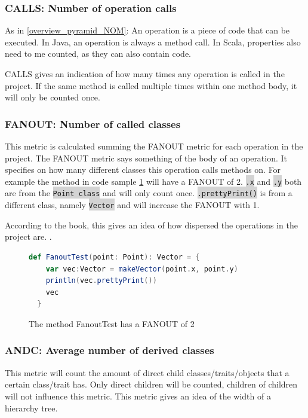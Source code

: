 \documentclass[onecolumn]{article}
\newcommand{\code}[1]{\colorbox{lightgray}{\texttt{#1}}}
\begin{document}
\subsubsection{CALLS: Number of operation calls} \label{overview_pyramid_CALLS}
As in \ref{overview_pyramid_NOM}: An operation is a piece of code that can be executed. In Java, an operation is always a method call. In Scala, properties also need to me counted, as they can also contain code.

CALLS gives an indication of how many times any operation is called in the project. If the same method is called multiple times within one method body, it will only be counted once.


\subsubsection{FANOUT: Number of called classes} \label{overview_pyramid_FANOUT}
This metric is calculated summing the FANOUT metric for each operation in the project. The FANOUT metric says something of the body of an operation. It specifies on how many different classes this operation calls methods on. For example the method in code sample \ref{fig:FanoutTest} will have a FANOUT of 2. \code{.x} and \code{.y} both are from the \code{Point class} and will only count once. \code{.prettyPrint()} is from a different class, namely \code{Vector} and will increase the FANOUT with 1.

According to the book, this gives an idea of how dispersed the operations in the project are. \cite{lanza2007object}.

\begin{figure}[H]
    \centering
    \begin{lstlisting}[language=scala]
  def FanoutTest(point: Point): Vector = {
    var vec:Vector = makeVector(point.x, point.y)
    println(vec.prettyPrint())
    vec
  }
    \end{lstlisting}
    \caption{The method FanoutTest has a FANOUT of 2}
    \label{fig:FanoutTest}
\end{figure}


\subsubsection{ANDC: Average number of derived classes} \label{overview_pyramid_ANDC}
This metric will count the amount of direct child classes/traits/objects that a certain class/trait has. Only direct children will be counted, children of children will not influence this metric. This metric gives an idea of the width of a hierarchy tree.
\end{document}
